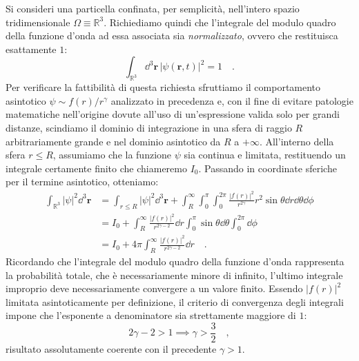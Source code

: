 Si consideri una particella confinata, per semplicità, nell'intero spazio tridimensionale $\Omega \equiv \mathbb{R}^3$. Richiediamo quindi che l'integrale del modulo quadro della funzione d'onda ad essa associata sia \emph{normalizzato}, ovvero che restituisca esattamente $1$:
\begin{equation}
    \int_{\mathbb{R}^3}  \dd^3{\bm{r}} \, |\psi(\bm{r},t)|^2 = 1 \quad.
    \label{eq:normalizzazione_ps}
\end{equation}
Per verificare la fattibilità di questa richiesta sfruttiamo il comportamento asintotico $\psi \sim f(r)/r^\gamma$  analizzato in precedenza e, con il fine di evitare patologie matematiche nell'origine dovute all'uso di un'espressione valida solo per grandi distanze, scindiamo il dominio di integrazione in una sfera di raggio $R$ arbitrariamente grande e nel dominio asintotico da $R$ a $+\infty$. All'interno della sfera $r \le R$, assumiamo che la funzione $\psi$ sia continua e limitata, restituendo un integrale certamente finito che chiameremo $I_0$. Passando in coordinate sferiche per il termine asintotico, otteniamo:
\begin{equation}
\begin{aligned}
    \int_{\mathbb{R}^3} |\psi|^2 \dd^3{\bm{r}} &= \int_{r \le R} |\psi|^2 \dd^3{\bm{r}} + \int_R^\infty \int_0^\pi \int_0^{2\pi} \frac{|f(r)|^2}{r^{2\gamma}} r^2 \sin \theta \dd{r} \dd{\theta} \dd{\phi} \\
    &= I_0 + \int_R^\infty \frac{|f(r)|^2}{r^{2\gamma-2}} \dd{r} {\int_0^\pi \sin\theta \dd{\theta}} {\int_0^{2\pi} \dd{\phi}} \\
    &= I_0 + 4\pi \int_R^\infty \frac{|f(r)|^2}{r^{2\gamma-2}} \dd{r} \quad.
    \label{eq:int_mod_quad}
\end{aligned}
\end{equation}
Ricordando che l'integrale del modulo quadro della funzione d'onda rappresenta la probabilità totale, che è necessariamente minore di infinito, l'ultimo integrale improprio deve necessariamente convergere a un valore finito. Essendo $|f(r)|^2$ limitata asintoticamente per definizione, il criterio di convergenza degli integrali impone che l'esponente a denominatore sia strettamente maggiore di $1$:
\begin{equation}
    2\gamma - 2 > 1 \implies \gamma > \frac{3}{2} \quad,
\end{equation}
risultato assolutamente coerente con il precedente $\gamma > 1$.


